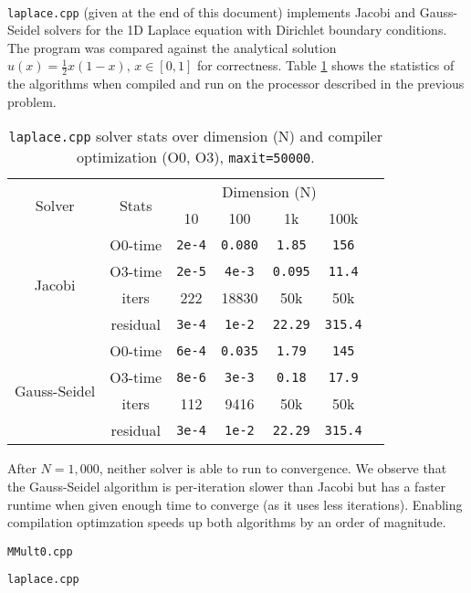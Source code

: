 \documentclass[12pt,reqno]{amsart}
\begin{document}
\begin{problem}[Laplace 1D] ~ \\
\texttt{laplace.cpp} (given at the end of this document) implements Jacobi and
Gauss-Seidel solvers for the 1D Laplace equation with Dirichlet boundary
conditions. The program was compared against the analytical solution $u(x) =
\frac{1}{2}x(1-x),\, x\in [0,1]$ for correctness. 
Table \ref{tab:stats} shows the statistics of the
algorithms when compiled and run on the processor described in the previous
problem.

\begin{table}[htb]
    \caption{\texttt{laplace.cpp} solver stats over dimension (N) and compiler
        optimization (O0, O3), \texttt{maxit=50000}.}
    \begin{tabular}{ccccccc}
    \multirow{2}{*}{Solver} & \multirow{2}{*}{Stats} & \multicolumn{4}{c}{Dimension (N)} \\
                         & & 10 & 100 & 1k & 100k \\\hline
    \multirow{4}{*}{Jacobi} 
                            & O0-time & \texttt{2e-4} & \texttt{0.080} & \texttt{1.85} & \texttt{156} \\
                            & O3-time & \texttt{2e-5} & \texttt{4e-3} & \texttt{0.095} & \texttt{11.4} \\
                            & iters   & 222 & 18830 & 50k & 50k \\
                            & residual & \texttt{3e-4} & \texttt{1e-2} & \texttt{22.29} & \texttt{315.4} \\\hline

    \multirow{4}{*}{Gauss-Seidel} 
                            & O0-time & \texttt{6e-4} & \texttt{0.035} & \texttt{1.79} & \texttt{145} \\
                            & O3-time & \texttt{8e-6} & \texttt{3e-3} & \texttt{0.18} & \texttt{17.9} \\
                            & iters   & 112 & 9416 & 50k & 50k \\
                            & residual & \texttt{3e-4} & \texttt{1e-2} & \texttt{22.29} & \texttt{315.4} \\\hline
    \end{tabular}
    \label{tab:stats}
\end{table}
\end{problem}

After $N=1,000$, neither solver is able to run to convergence. We observe that
the Gauss-Seidel algorithm is per-iteration slower than Jacobi but has a faster
runtime when given enough time to converge (as it uses less iterations). 
Enabling compilation optimzation speeds up both algorithms by an
order of magnitude.


\newpage
\verb!MMult0.cpp!


\newpage
\verb!laplace.cpp!

\end{document}
